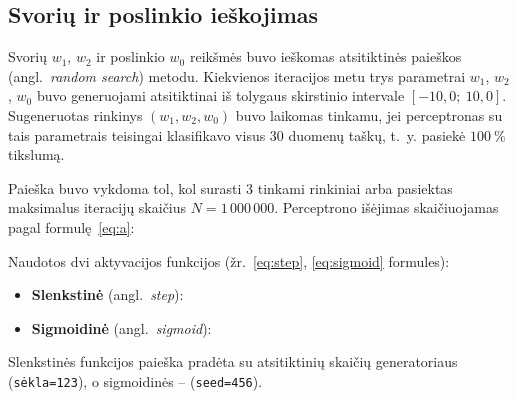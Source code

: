\subsection{Svorių ir poslinkio ieškojimas}
\label{subsec:ieskojimas}

Svorių $w_1$, $w_2$ ir poslinkio $w_0$ reikšmės buvo ieškomas atsitiktinės paieškos (angl.~\textit{random search}) metodu. Kiekvienos iteracijos metu trys parametrai $w_1$, $w_2$, $w_0$ buvo generuojami atsitiktinai iš tolygaus skirstinio intervale $[-10{,}0;\ 10{,}0]$. Sugeneruotas rinkinys $(w_1, w_2, w_0)$ buvo laikomas tinkamu, jei perceptronas su tais parametrais teisingai klasifikavo visus 30 duomenų taškų, t.~y. pasiekė $100\ \%$ tikslumą.

Paieška buvo vykdoma tol, kol surasti 3 tinkami rinkiniai arba pasiektas maksimalus iteracijų skaičius $N = 1\,000\,000$. Perceptrono išėjimas skaičiuojamas pagal formulę~\eqref{eq:a}:


Naudotos dvi aktyvacijos funkcijos (žr.~\ref{eq:step}, \ref{eq:sigmoid} formules):
\begin{itemize}
    \item \textbf{Slenkstinė} (angl.~\textit{step}):
        
    \item \textbf{Sigmoidinė} (angl.~\textit{sigmoid}):
        
\end{itemize}

Slenkstinės funkcijos paieška pradėta su atsitiktinių skaičių generatoriaus (\texttt{sėkla=123}), o sigmoidinės – (\texttt{seed=456}).